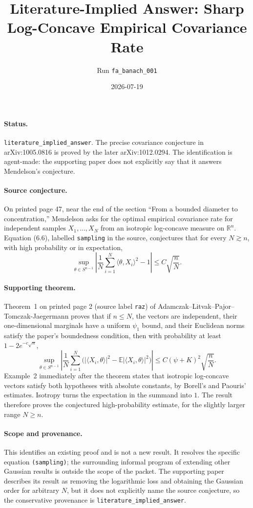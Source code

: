 \documentclass[10pt]{article}
\title{Literature-Implied Answer: Sharp Log-Concave Empirical Covariance Rate}
\author{Run \texttt{fa\_banach\_001}}
\date{2026-07-19}
\begin{document}
\maketitle
\vspace{-1.2em}

\paragraph{Status.}
\texttt{literature\_implied\_answer}.  The precise covariance conjecture in
arXiv:1005.0816 is proved by the later arXiv:1012.0294.  The identification is
agent-made: the supporting paper does not explicitly say that it answers
Mendelson's conjecture.

\paragraph{Source conjecture.}
On printed page 47, near the end of the section
``From a bounded diameter to concentration,''
Mendelson asks for the optimal empirical covariance rate for independent
samples \(X_1,\ldots,X_N\) from an isotropic log-concave measure on
\(\mathbb R^n\).  Equation (6.6), labelled \texttt{sampling} in the source,
conjectures that for every
\(N\gtrsim n\), with high probability or in expectation,
\[
 \sup_{\theta\in S^{n-1}}
 \left|\frac1N\sum_{i=1}^N\langle\theta,X_i\rangle^2-1\right|
 \le C\sqrt{\frac nN}.
\]

\paragraph{Supporting theorem.}
Theorem~1 on printed page 2 (source label \texttt{raz}) of
Adamczak--Litvak--Pajor--Tomczak-Jaegermann proves that if \(n\le N\), the
vectors are independent,
their one-dimensional marginals have a uniform \(\psi_1\) bound, and their
Euclidean norms satisfy the paper's boundedness condition, then with
probability at least \(1-2e^{-c\sqrt n}\),
\[
 \sup_{\theta\in S^{n-1}}
 \left|\frac1N\sum_{i=1}^N
 \bigl(|\langle X_i,\theta\rangle|^2
       -\mathbb E|\langle X_i,\theta\rangle|^2\bigr)\right|
 \le C(\psi+K)^2\sqrt{\frac nN}.
\]
Example~2 immediately after the theorem states that isotropic log-concave
vectors satisfy both hypotheses with absolute constants, by Borell's and
Paouris' estimates.  Isotropy turns the expectation in the summand into \(1\).
The result therefore proves the conjectured high-probability estimate, for the
slightly larger range \(N\ge n\).

\paragraph{Scope and provenance.}
This identifies an existing proof and is not a new result.  It resolves the
specific equation \texttt{(sampling)}; the surrounding informal program of
extending other Gaussian results is outside the scope of the packet.  The
supporting paper describes its result as removing the logarithmic loss and
obtaining the Gaussian order for arbitrary \(N\), but it does not explicitly
name the source conjecture, so the conservative provenance is
\texttt{literature\_implied\_answer}.
\end{document}
